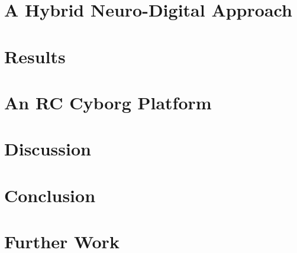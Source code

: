 \documentclass[journal]{IEEEtran}
\begin{document}
\section{A Hybrid Neuro-Digital Approach}

% 
\section{Results}

% 
\section{An RC Cyborg Platform}

\section{Discussion}

\section{Conclusion}

\section{Further Work}



 

\end{document}
